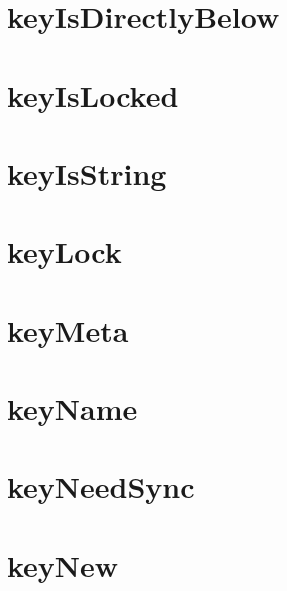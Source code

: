 \let\mypdfximage\pdfximage\def\pdfximage{\immediate\mypdfximage}\documentclass[twoside]{book}
\newcommand{\+}{\discretionary{\mbox{\scriptsize$\hookleftarrow$}}{}{}}
\begin{document}
\chapter{key\+Is\+Directly\+Below}
\label{doc_contrib_api_reviews_core_keyIsDirectlyBelow_md}

\chapter{key\+Is\+Locked}
\label{doc_contrib_api_reviews_core_keyIsLocked_md}

\chapter{key\+Is\+String}
\label{doc_contrib_api_reviews_core_keyIsString_md}

\chapter{key\+Lock}
\label{doc_contrib_api_reviews_core_keyLock_md}

\chapter{key\+Meta}
\label{doc_contrib_api_reviews_core_keyMeta_md}

\chapter{key\+Name}
\label{doc_contrib_api_reviews_core_keyName_md}

\chapter{key\+Need\+Sync}
\label{doc_contrib_api_reviews_core_keyNeedSync_md}

\chapter{key\+New}
\label{doc_contrib_api_reviews_core_keyNew_md}

\end{document}
